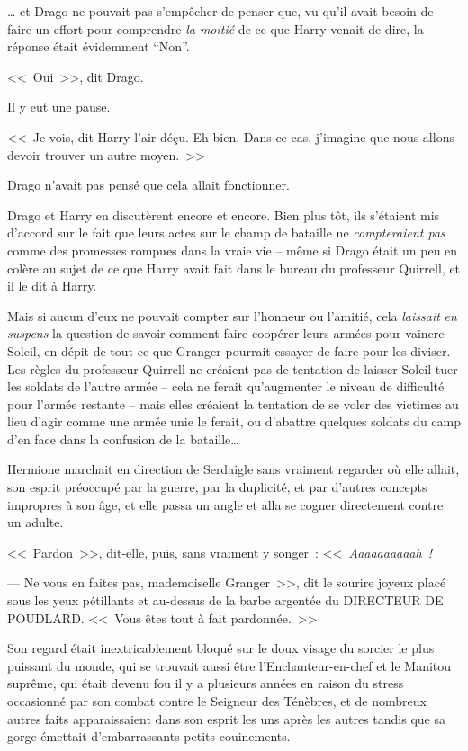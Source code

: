 … et Drago ne pouvait pas s'empêcher de penser que, vu qu'il avait besoin de faire un effort pour comprendre \emph{la moitié} de ce que Harry venait de dire, la réponse était évidemment “Non”.

<<~Oui~>>, dit Drago.

Il y eut une pause.

<<~Je vois, dit Harry l'air déçu. Eh bien. Dans ce cas, j'imagine que nous allons devoir trouver un autre moyen.~>>

Drago n'avait pas pensé que cela allait fonctionner.

Drago et Harry en discutèrent encore et encore. Bien plus tôt, ils s'étaient mis d'accord sur le fait que leurs actes sur le champ de bataille ne \emph{compteraient pas} comme des promesses rompues dans la vraie vie -- même si Drago était un peu en colère au sujet de ce que Harry avait fait dans le bureau du professeur Quirrell, et il le dit à Harry.

Mais si aucun d'eux ne pouvait compter sur l'honneur ou l'amitié, cela \emph{laissait} \emph{en suspens} la question de savoir comment faire coopérer leurs armées pour vaincre Soleil, en dépit de tout ce que Granger pourrait essayer de faire pour les diviser. Les règles du professeur Quirrell ne créaient pas de tentation de laisser Soleil tuer les soldats de l'autre armée -- cela ne ferait qu'augmenter le niveau de difficulté pour l'armée restante -- mais elles créaient la tentation de se voler des victimes au lieu d'agir comme une armée unie le ferait, ou d'abattre quelques soldats du camp d'en face dans la confusion de la bataille…

\later

Hermione marchait en direction de Serdaigle sans vraiment regarder où elle allait, son esprit préoccupé par la guerre, par la duplicité, et par d'autres concepts impropres à son âge, et elle passa un angle et alla se cogner directement contre un adulte.

<<~Pardon~>>, dit-elle, puis, sans vraiment y songer~: <<~\emph{Aaaaaaaaaah~!}

--- Ne vous en faites pas, mademoiselle Granger~>>, dit le sourire joyeux placé sous les yeux pétillants et au-dessus de la barbe argentée du DIRECTEUR DE POUDLARD. <<~Vous êtes tout à fait pardonnée.~>>

Son regard était inextricablement bloqué sur le doux visage du sorcier le plus puissant du monde, qui se trouvait aussi être l'Enchanteur-en-chef et le Manitou suprême, qui était devenu fou il y a plusieurs années en raison du stress occasionné par son combat contre le Seigneur des Ténèbres, et de nombreux autres faits apparaissaient dans son esprit les uns après les autres tandis que sa gorge émettait d'embarrassants petits couinements.

